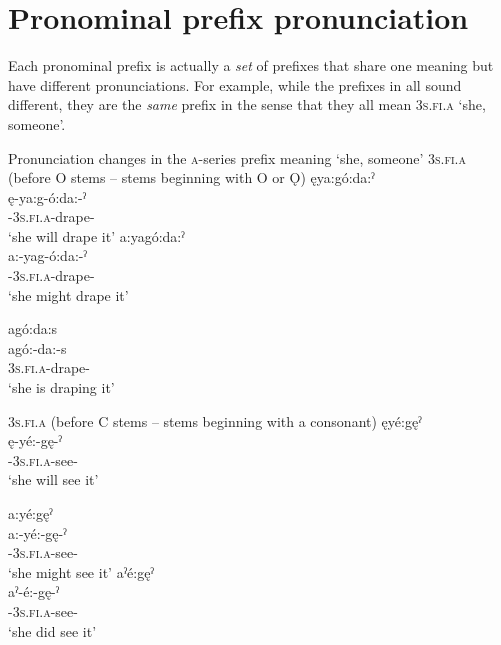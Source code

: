 \chapter{Pronominal prefix pronunciation} \label{Pronominal prefix pronunciation}
Each pronominal prefix is actually a \emph{set} of prefixes that share one meaning but have different pronunciations. For example, while the prefixes in  all sound different, they are the \emph{same} prefix in the sense that they all mean \textsc{3s.fi.a} ‘she, someone’.  

\ea\label{ex:pronominalprefixpronunex} Pronunciation changes in the \textsc{a}-series prefix meaning ‘she, someone’
    \ea {} \textsc{3s.fi.a} (before O stems -- stems beginning with O or Ǫ)\label{ex:pronominalprefixpronunexa}
	\ea ęya:gó:da:ˀ\\  \label{ex:pronominalprefixpronunexai}
        \gll ę-ya:g-ó:da:-ˀ \\
        \fut-\textsc{3s.fi.a}-drape-{\punctual}\\
        \glt ‘she will drape it’
	    \ex a:yagó:da:ˀ \\ \label{ex:pronominalprefixpronunexaii}
                 \gll a:-yag-ó:da:-ˀ \\
                 {\indefinite}-\textsc{3s.fi.a}-drape-{\punctual}\\
                \glt ‘she might drape it’ 

	    \ex agó:da:s \\ \label{ex:pronominalprefixpronunexaiii}
                \gll agó:-da:-s \\
                 \textsc{3s.fi.a}-drape-{\habitual}\\
                \glt ‘she is draping it’ 
     
	\z
    \ex {} \textsc{3s.fi.a} (before C stems -- stems beginning with a consonant)\label{ex:pronominalprefixpronunexb}
	\ea ęyé:gęˀ \\
             \gll ę-yé:-gę-ˀ \\ \label{ex:pronominalprefixpronunexbi}
            \fut-\textsc{3s.fi.a}-see-{\punctual}\\
             \glt ‘she will see it’ 

	    \ex a:yé:gęˀ \\ \label{ex:pronominalprefixpronunexbii}
     \gll a:-yé:-gę-ˀ \\
     {\indefinite}-\textsc{3s.fi.a}-see-{\punctual}\\
     \glt ‘she might see it’ 
\newpage
	    \ex aˀé:gęˀ \\ \label{ex:pronominalprefixpronunexbiii}
     \gll  aˀ-é:-gę-ˀ \\
     {\factual}-\textsc{3s.fi.a}-see-{\punctual}\\
     \glt  ‘she did see it’ 
   

